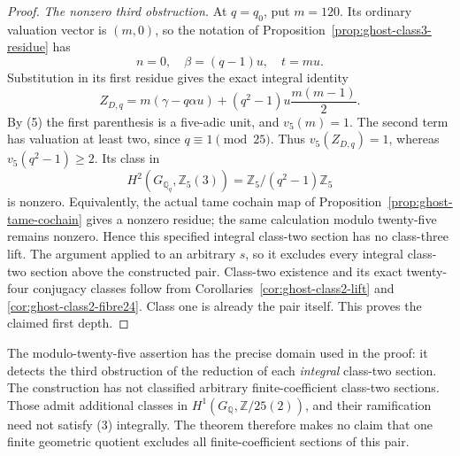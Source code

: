 \begin{proof}
\emph{The nonzero third obstruction.}
At \(q=q_0\), put \(m=120\). Its ordinary
valuation vector is \((m,0)\), so the notation
of Proposition~\ref{prop:ghost-class3-residue} has
\[
 n=0,\quad \beta=(q-1)u,\quad t=mu.
\]
Substitution in its first residue gives the exact
integral identity
\[
 Z_{D,q}
   =m(\gamma-q\alpha u)
       +(q^2-1)u\frac{m(m-1)}2.                 \tag{6}
\]
By (5) the first parenthesis is a five-adic unit,
and \(v_5(m)=1\). The second term has valuation
at least two, since \(q\equiv1\pmod{25}\).
Thus \(v_5(Z_{D,q})=1\), whereas
\(v_5(q^2-1)\ge2\). Its class in
\[
 H^2(G_{\mathbb Q_q},\mathbb Z_5(3))
             =\mathbb Z_5/(q^2-1)\mathbb Z_5
\]
is nonzero. Equivalently, the actual tame cochain map
of Proposition~\ref{prop:ghost-tame-cochain} gives
a nonzero residue; the same calculation modulo
twenty-five remains nonzero. Hence this specified
integral class-two section has no class-three lift.
The argument applied to an arbitrary \(s\), so it
excludes every integral class-two section above the
constructed pair. Class-two existence and its exact
twenty-four conjugacy classes follow from
Corollaries~\ref{cor:ghost-class2-lift} and
\ref{cor:ghost-class2-fibre24}. Class one is already
the pair itself. This proves the claimed first depth.
\end{proof}

The modulo-twenty-five assertion has the precise domain
used in the proof: it detects the third obstruction
of the reduction of each \emph{integral} class-two
section. The construction has not classified arbitrary
finite-coefficient class-two sections. Those admit
additional classes in
\(H^1(G_{\mathbb Q},\mathbb Z/25(2))\), and their
ramification need not satisfy (3) integrally. The
theorem therefore makes no claim that one finite
geometric quotient excludes all finite-coefficient
sections of this pair.
